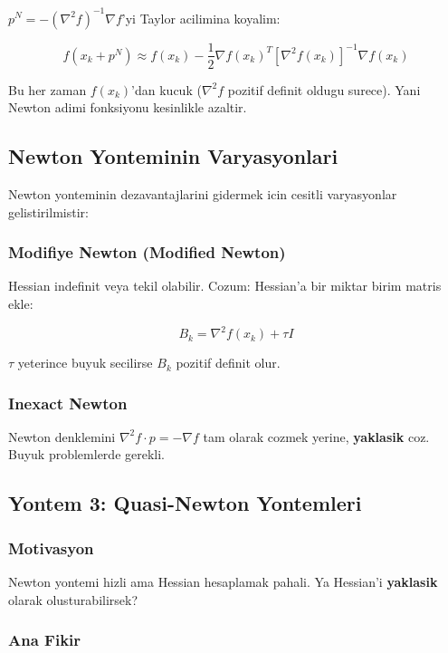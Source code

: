 \documentclass[12pt,a4paper]{article}
\theoremstyle{definition}
\theoremstyle{remark}
\begin{document}
$p^N = -(\nabla^2 f)^{-1} \nabla f$'yi Taylor acilimina koyalim:

\[
f(x_k + p^N) \approx f(x_k) - \frac{1}{2} \nabla f(x_k)^T [\nabla^2 f(x_k)]^{-1} \nabla f(x_k)
\]

Bu her zaman $f(x_k)$'dan kucuk ($\nabla^2 f$ pozitif definit oldugu surece). Yani Newton adimi fonksiyonu kesinlikle azaltir.

\subsection{Newton Yonteminin Varyasyonlari}

Newton yonteminin dezavantajlarini gidermek icin cesitli varyasyonlar gelistirilmistir:

\subsubsection{Modifiye Newton (Modified Newton)}

Hessian indefinit veya tekil olabilir. Cozum: Hessian'a bir miktar birim matris ekle:

\[
B_k = \nabla^2 f(x_k) + \tau I
\]

$\tau$ yeterince buyuk secilirse $B_k$ pozitif definit olur.

\subsubsection{Inexact Newton}

Newton denklemini $\nabla^2 f \cdot p = -\nabla f$ tam olarak cozmek yerine, \textbf{yaklasik} coz. Buyuk problemlerde gerekli.

\subsection{Yontem 3: Quasi-Newton Yontemleri}

\subsubsection{Motivasyon}

Newton yontemi hizli ama Hessian hesaplamak pahali. Ya Hessian'i \textbf{yaklasik} olarak olusturabilirsek?

\subsubsection{Ana Fikir}
\end{document}
